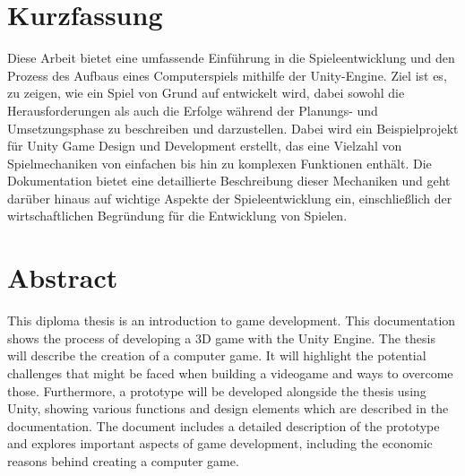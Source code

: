 \chapter{Kurzfassung}

Diese Arbeit bietet eine umfassende Einführung in die Spieleentwicklung und den Prozess des Aufbaus eines Computerspiels mithilfe der Unity-Engine. Ziel ist es, zu zeigen, wie ein Spiel von Grund auf entwickelt wird, dabei sowohl die Herausforderungen als auch die Erfolge während der Planungs- und Umsetzungsphase zu beschreiben und darzustellen. Dabei wird ein Beispielprojekt für Unity Game Design und Development erstellt, das eine Vielzahl von Spielmechaniken von einfachen bis hin zu komplexen Funktionen enthält. Die Dokumentation bietet eine detaillierte Beschreibung dieser Mechaniken und geht darüber hinaus auf wichtige Aspekte der Spieleentwicklung ein, einschließlich der wirtschaftlichen Begründung für die Entwicklung von Spielen.

\chapter{Abstract}

This diploma thesis is an introduction to game development. This documentation shows the process of developing a 3D game with the Unity Engine. The thesis will describe the creation of a computer game. It will highlight the potential challenges that might be faced when building a videogame and ways to overcome those. Furthermore, a prototype will be developed alongside the thesis using Unity, showing various functions and design elements which are described in the documentation. The document includes a detailed description of the prototype and explores important aspects of game development, including the economic reasons behind creating a computer game.